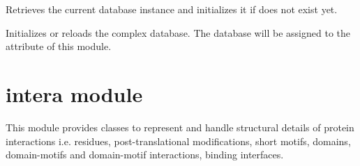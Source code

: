 \documentclass[letterpaper,10pt,english]{sphinxmanual}
\begin{document}

\begin{fulllineitems}
\label{\detokenize{reference:pypath.complex.Pdb}}
\end{fulllineitems}


\begin{fulllineitems}
\label{\detokenize{reference:pypath.complex.Signor}}
\end{fulllineitems}


\begin{fulllineitems}
\label{\detokenize{reference:pypath.complex.get_db}}
Retrieves the current database instance and initializes it if does
not exist yet.

\end{fulllineitems}


\begin{fulllineitems}
\label{\detokenize{reference:pypath.complex.init_db}}
Initializes or reloads the complex database.
The database will be assigned to the  attribute of this module.

\end{fulllineitems}



\section{intera module}
\label{\detokenize{reference:module-pypath.intera}}\label{\detokenize{reference:intera-module}}
This module provides classes to represent and handle
structural details of protein interactions
i.e. residues, post-translational modifications,
short motifs, domains, domain-motifs and
domain-motif interactions, binding interfaces.
\end{document}
